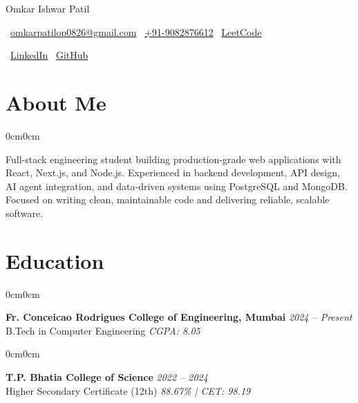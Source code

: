 \documentclass[10pt, letterpaper]{article}
\makeatletter
\newcommand{\YourName}{Omkar Ishwar Patil}
\newcommand{\YourEmail}{omkarpatilop0826@gmail.com}
\newcommand{\YourPhone}{+91-9082876612}
\newcommand{\YourLinkedIn}{https://www.linkedin.com/in/omkar-patil-1a8818346/}
\newcommand{\YourGithub}{https://github.com/Omkarop0808}
\newenvironment{onecolentry}{
    \begin{adjustwidth}{0cm}{0cm}
}{
    \end{adjustwidth}
}
\makeatother
\begin{document}
\begin{center}
    {\fontsize{23pt}{23pt}\selectfont \YourName}

    \vspace{4pt}

    \normalsize
    {\color{iconGray}\faEnvelope}~\href{mailto:\YourEmail}{\YourEmail} \quad
    {\color{iconGray}\faPhone}~\href{tel:\YourPhone}{\YourPhone} \quad
    {\color{iconGray}\faCode}~\href{https://leetcode.com/u/Omkar_08_OP/}{LeetCode}

    \vspace{2pt}

    {\color{iconGray}\faLinkedin}~\href{\YourLinkedIn}{LinkedIn} \quad
    {\color{iconGray}\faGithub}~\href{\YourGithub}{GitHub}
\end{center}

\vspace{0.1cm}

\section{About Me}

\begin{onecolentry}
Full-stack engineering student building production-grade web applications with React, Next.js, and Node.js. Experienced in backend development, API design, AI agent integration, and data-driven systems using PostgreSQL and MongoDB. Focused on writing clean, maintainable code and delivering reliable, scalable software.
\end{onecolentry}

\section{Education}

\begin{onecolentry}
\textbf{Fr. Conceicao Rodrigues College of Engineering, Mumbai} \hfill \textit{2024 -- Present} \\
B.Tech in Computer Engineering \hfill \textit{CGPA: 8.05}
\end{onecolentry}

\vspace{0.05cm}

\begin{onecolentry}
\textbf{T.P. Bhatia College of Science} \hfill \textit{2022 -- 2024} \\
Higher Secondary Certificate (12th) \hfill \textit{88.67\% \;|\; CET: 98.19}
\end{onecolentry}
\end{document}
